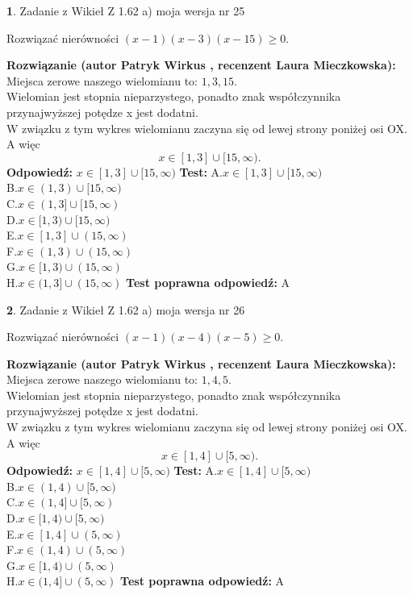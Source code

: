 \documentclass[12pt, a4paper]{article}
\theoremstyle{definition} %
\newtheorem{zad}{}
\newcommand{\zadStart}[1]{\begin{zad}#1\newline}
\newcommand{\zadStop}{\end{zad}}
\newcommand{\rozwStart}[2]{\noindent \textbf{Rozwiązanie (autor #1 , recenzent #2): }\newline}
\newcommand{\rozwStop}{\newline}
\newcommand{\odpStart}{\noindent \textbf{Odpowiedź:}\newline}
\newcommand{\odpStop}{\newline}
\newcommand{\testStart}{\noindent \textbf{Test:}\newline}
\newcommand{\testStop}{\newline}
\newcommand{\kluczStart}{\noindent \textbf{Test poprawna odpowiedź:}\newline}
\newcommand{\kluczStop}{\newline}
\begin{document}
\zadStart{Zadanie z Wikieł Z 1.62 a) moja wersja nr 25}

Rozwiązać nierówności $(x-1)(x-3)(x-15)\ge0$.
\zadStop
\rozwStart{Patryk Wirkus}{Laura Mieczkowska}
Miejsca zerowe naszego wielomianu to: $1, 3, 15$.\\
Wielomian jest stopnia nieparzystego, ponadto znak współczynnika przy\linebreak najwyższej potędze x jest dodatni.\\ W związku z tym wykres wielomianu zaczyna się od lewej strony poniżej osi OX. A więc $$x \in [1,3] \cup [15,\infty).$$
\rozwStop
\odpStart
$x \in [1,3] \cup [15,\infty)$
\odpStop
\testStart
A.$x \in [1,3] \cup [15,\infty)$\\
B.$x \in (1,3) \cup [15,\infty)$\\
C.$x \in (1,3] \cup [15,\infty)$\\
D.$x \in [1,3) \cup [15,\infty)$\\
E.$x \in [1,3] \cup (15,\infty)$\\
F.$x \in (1,3) \cup (15,\infty)$\\
G.$x \in [1,3) \cup (15,\infty)$\\
H.$x \in (1,3] \cup (15,\infty)$
\testStop
\kluczStart
A
\kluczStop



\zadStart{Zadanie z Wikieł Z 1.62 a) moja wersja nr 26}

Rozwiązać nierówności $(x-1)(x-4)(x-5)\ge0$.
\zadStop
\rozwStart{Patryk Wirkus}{Laura Mieczkowska}
Miejsca zerowe naszego wielomianu to: $1, 4, 5$.\\
Wielomian jest stopnia nieparzystego, ponadto znak współczynnika przy\linebreak najwyższej potędze x jest dodatni.\\ W związku z tym wykres wielomianu zaczyna się od lewej strony poniżej osi OX. A więc $$x \in [1,4] \cup [5,\infty).$$
\rozwStop
\odpStart
$x \in [1,4] \cup [5,\infty)$
\odpStop
\testStart
A.$x \in [1,4] \cup [5,\infty)$\\
B.$x \in (1,4) \cup [5,\infty)$\\
C.$x \in (1,4] \cup [5,\infty)$\\
D.$x \in [1,4) \cup [5,\infty)$\\
E.$x \in [1,4] \cup (5,\infty)$\\
F.$x \in (1,4) \cup (5,\infty)$\\
G.$x \in [1,4) \cup (5,\infty)$\\
H.$x \in (1,4] \cup (5,\infty)$
\testStop
\kluczStart
A
\kluczStop
\end{document}
